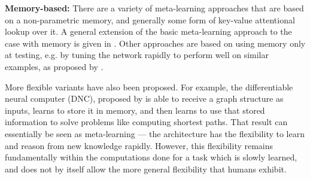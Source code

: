 \textbf{Memory-based:} There are a variety of meta-learning approaches that are based on a non-parametric memory, and generally some form of key-value attentional lookup over it. A general extension of the basic meta-learning approach to the case with memory is given in \citet{Santoro2016}. Other approaches are based on using memory only at testing, e.g. by tuning the network rapidly to perform well on similar examples, as proposed by \citet{Sprechmann2018}. \par 
More flexible variants have also been proposed. For example, the differentiable neural computer (DNC), proposed by \citet{Graves2016} is able to receive a graph structure as inputs, learns to store it in memory, and then learns to use that stored information to solve problems like computing shortest paths. That result can essentially be seen as meta-learning --- the architecture has the flexibility to learn and reason from new knowledge rapidly. However, this flexibility remains fundamentally within the computations done for a task which is slowly learned, and does not by itself allow the more general flexibility that humans exhibit. \par

